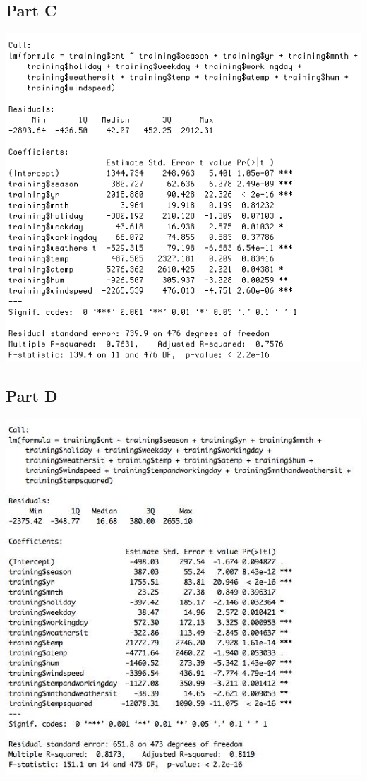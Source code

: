 \documentclass[11pt]{article}
\begin{document}
\subsection{Part C}
\label{subsec:problem2coutput}
\includegraphics[totalheight=0.65\textheight]{Output.jpg}
\subsection{Part D}
\label{subsec:problem2doutput}
\includegraphics[totalheight=0.65\textheight]{Part2Doutput.jpg}
\pagebreak
\end{document}

